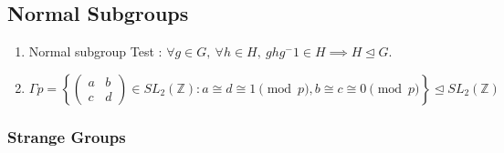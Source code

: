 \subsection{Normal Subgroups}
\begin{enumerate}
	\item Normal subgroup Test : $\forall g \in G,\ \forall h \in H,\ ghg^-1 \in H \implies H \trianglelefteq G$.
	\item $$\Gamma p = \left\{ \begin{pmatrix} a & b \\ c & d \end{pmatrix} \in SL_2(\mathbb{Z}) : a \cong d \cong 1 \pmod{p}, b \cong c \cong 0 \pmod{p} \right\} \trianglelefteq SL_2(\mathbb{Z})$$
\end{enumerate}

\subsubsection{Strange Groups}
